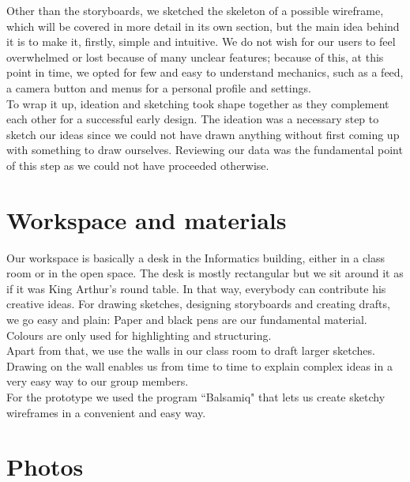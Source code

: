\documentclass[12pt]{scrartcl}
\begin{document}
	Other than the storyboards, we sketched the skeleton of a possible wireframe, which will be
	covered in more detail in its own section, but the main idea behind it is to make it, firstly,
	simple and intuitive. We do not wish for our users to feel overwhelmed or lost because of
	many unclear features; because of this, at this point in time, we opted for few and easy to
	understand mechanics, such as a feed, a camera button and menus for a personal profile and
	settings.\\
	
	To wrap it up, ideation and sketching took shape together as they complement each other for
	a successful early design. The ideation was a necessary step to sketch our ideas since we
	could not have drawn anything without first coming up with something to draw ourselves.
	Reviewing our data was the fundamental point of this step as we could not have proceeded
	otherwise.\\
	

\section{Workspace and materials}

	
	Our workspace is basically a desk in the Informatics building, either in a class room or in the open space. The desk is mostly rectangular 
	but we sit around it as if it was King Arthur's round table. In that way, everybody can contribute his creative ideas. For drawing sketches, 
	designing storyboards and creating drafts, we go easy and plain: Paper and black pens are our fundamental material. 
	Colours are only used for highlighting and structuring.\\
	
	Apart from that, we use the walls in our class room to draft larger sketches. Drawing on the wall enables us from time to time to explain 
	complex ideas in a very easy way to our group members.\\
	
	For the prototype we used the program ``Balsamiq" that lets us create sketchy wireframes in a convenient and easy way.\\
	
	
\section{Photos}

	
\end{document}
